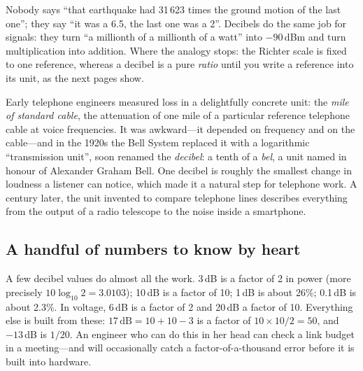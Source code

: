 

\begin{analogy}
Nobody says ``that earthquake had 31\,623 times the ground motion of the last one''; they say ``it
was a 6.5, the last one was a 2''. Decibels do the same job for signals: they turn ``a millionth of
a millionth of a watt'' into $-90$\,dBm and turn multiplication into addition. Where the analogy
stops: the Richter scale is fixed to one reference, whereas a decibel is a pure \emph{ratio} until
you write a reference into its unit, as the next pages show.
\end{analogy}

\begin{history}
Early telephone engineers measured loss in a delightfully concrete unit: the \emph{mile of
standard cable}, the attenuation of one mile of a particular reference telephone cable at voice
frequencies. It was awkward---it depended on frequency and on the cable---and in the 1920s the Bell
System replaced it with a logarithmic ``transmission unit'', soon renamed the \emph{decibel}: a
tenth of a \emph{bel}, a unit named in honour of Alexander Graham Bell. One decibel is roughly
the smallest change in loudness a listener can notice, which made it a natural step for telephone
work. A century later, the unit invented to compare telephone lines describes
everything from the output of a radio telescope to the noise inside a smartphone.
\end{history}

\subsection{A handful of numbers to know by heart}

A few decibel values do almost all the work. 3\,dB is a factor of 2 in power (more precisely
$10\log_{10}2=3.0103$); 10\,dB is a factor of 10; 1\,dB is about 26\%; 0.1\,dB is about 2.3\%. In
voltage, 6\,dB is a factor of 2 and 20\,dB a factor of 10. Everything else is built from these:
$17\,\text{dB}=10+10-3$ is a factor of $10\times10/2=50$, and $-13$\,dB is $1/20$. An engineer who
can do this in her head can check a link budget in a meeting---and will occasionally catch a
factor-of-a-thousand error before it is built into hardware.

